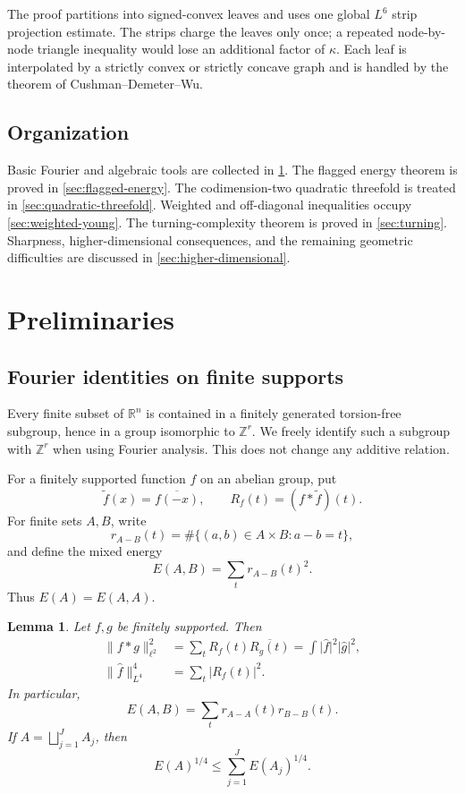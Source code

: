 \documentclass[11pt]{amsart}
\numberwithin{equation}{section}
\newtheorem{lemma}[theorem]{Lemma}
\theoremstyle{definition}
\theoremstyle{remark}
\newcommand{\R}{\mathbb R}
\newcommand{\Z}{\mathbb Z}
\newcommand{\1}{\mathbf 1}
\newcommand{\wt}[1]{\widetilde{#1}}
\newcommand{\norm}[2][]{\lVert #2\rVert_{#1}}
\begin{document}
The proof partitions into signed-convex leaves and uses one global $L^6$ strip projection estimate.  The strips charge the leaves only once; a repeated node-by-node triangle inequality would lose an additional factor of $\kappa$.  Each leaf is interpolated by a strictly convex or strictly concave graph and is handled by the theorem of Cushman--Demeter--Wu.

\subsection{Organization}
Basic Fourier and algebraic tools are collected in \cref{sec:preliminaries}.  The flagged energy theorem is proved in \cref{sec:flagged-energy}.  The codimension-two quadratic threefold is treated in \cref{sec:quadratic-threefold}.  Weighted and off-diagonal inequalities occupy \cref{sec:weighted-young}.  The turning-complexity theorem is proved in \cref{sec:turning}.  Sharpness, higher-dimensional consequences, and the remaining geometric difficulties are discussed in \cref{sec:higher-dimensional}.

\section{Preliminaries}\label{sec:preliminaries}

\subsection{Fourier identities on finite supports}
Every finite subset of $\R^n$ is contained in a finitely generated torsion-free subgroup, hence in a group isomorphic to $\Z^r$.  We freely identify such a subgroup with $\Z^r$ when using Fourier analysis.  This does not change any additive relation.

For a finitely supported function $f$ on an abelian group, put
\[
 \wt f(x)=\overline{f(-x)},
 \qquad
 R_f(t)=(f*\wt f)(t).
\]
For finite sets $A,B$, write
\[
 r_{A-B}(t)=\#\{(a,b)\in A\times B:a-b=t\},
\]
and define the mixed energy
\begin{equation}\label{eq:mixed-energy}
 E(A,B)=\sum_t r_{A-B}(t)^2.
\end{equation}
Thus $E(A)=E(A,A)$.

\begin{lemma}\label{lem:energy-identities}
Let $f,g$ be finitely supported.  Then
\begin{align}
 \norm[\ell^2]{f*g}^2
 &=\sum_t R_f(t)\overline{R_g(t)}
 =\int \lvert\widehat f\rvert^2\lvert\widehat g\rvert^2,\label{eq:bilinear-correlation}\\
 \norm[L^4]{\widehat f}^4
 &=\sum_t\lvert R_f(t)\rvert^2.\label{eq:weighted-energy}
\end{align}
In particular,
\begin{equation}\label{eq:mixed-identity}
 E(A,B)=\sum_t r_{A-A}(t)r_{B-B}(t).
\end{equation}
If $A=\bigsqcup_{j=1}^J A_j$, then
\begin{equation}\label{eq:union-fourth-root}
 E(A)^{1/4}\leq\sum_{j=1}^J E(A_j)^{1/4}.
\end{equation}
\end{lemma}
\end{document}
